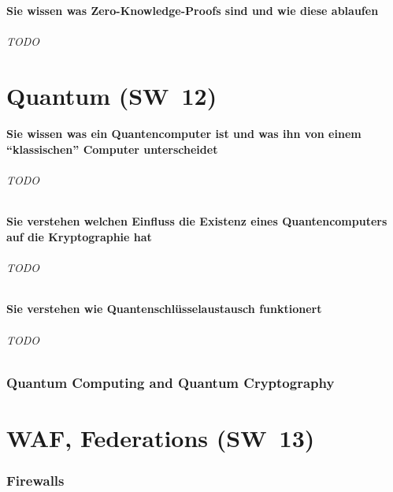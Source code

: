 \documentclass[10pt,a4paper]{article}
\begin{document}
\subsection*{Sie wissen was Zero-Knowledge-Proofs sind und wie diese ablaufen}
\paragraph*{TODO}



\part{Quantum (SW~12)}
\subsection*{Sie wissen was ein Quantencomputer ist und was ihn von einem "`klassischen"' Computer unterscheidet}
\paragraph*{TODO}
\subsection*{Sie verstehen welchen Einfluss die Existenz eines Quantencomputers auf die Kryptographie hat}
\paragraph*{TODO}
\subsection*{Sie verstehen wie Quantenschlüsselaustausch funktionert}
\paragraph*{TODO}


\section{Quantum Computing and Quantum Cryptography}
\part{WAF, Federations (SW~13)}
\section{Firewalls}
\end{document}
